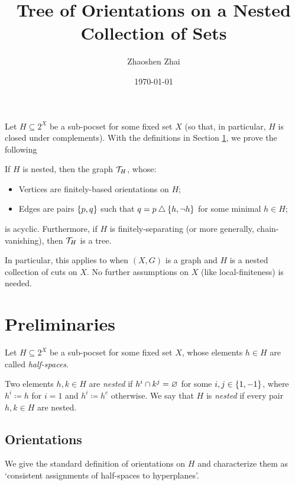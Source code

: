 \documentclass{amsart}
\begin{document}
    \title{Tree of Orientations on a Nested Collection of Sets}
    \author{Zhaoshen Zhai}
    \date{\today}
    \maketitle

    Let $H\subseteq2^X$ be a sub-pocset for some fixed set $X$ (so that, in particular, $H$ is closed under complements). With the definitions in Section \ref{prelim}, we prove the following
    \begin{mainTheorem}\label{main}
        If $H$ is nested, then the graph $\mc{T}_H$, whose:
        \begin{itemize}
            \item Vertices are finitely-based orientations on $H$;
            \item Edges are pairs $\l\{p,q\r\}$ such that $q=p\symdiff\l\{h,\lnot h\r\}$ for some minimal $h\in H$;
        \end{itemize}
        is acyclic. Furthermore, if $H$ is finitely-separating (or more generally, chain-vanishing), then $\mc{T}_H$ is a tree.
    \end{mainTheorem}

    In particular, this applies to when $(X,G)$ is a graph and $H$ is a nested collection of cuts on $X$. No further assumptions on $X$ (like local-finiteness) is needed.

    \section{Preliminaries}\label{prelim}

    Let $H\subseteq2^X$ be a sub-pocset for some fixed set $X$, whose elements $h\in H$ are called \textit{half-spaces}.

    \begin{definition}
        Two elements $h,k\in H$ are \textit{nested} if $h^i\cap k^j=\em$ for some $i,j\in\l\{1,-1\r\}$, where $h^i\coloneqq h$ for $i=1$ and $h^i\coloneqq h^c$ otherwise. We say that $H$ is \textit{nested} if every pair $h,k\in H$ are nested.
    \end{definition}

    \subsection{Orientations}

    We give the standard definition of orientations on $H$ and characterize them as `consistent assignments of half-spaces to hyperplanes'.
\end{document}
